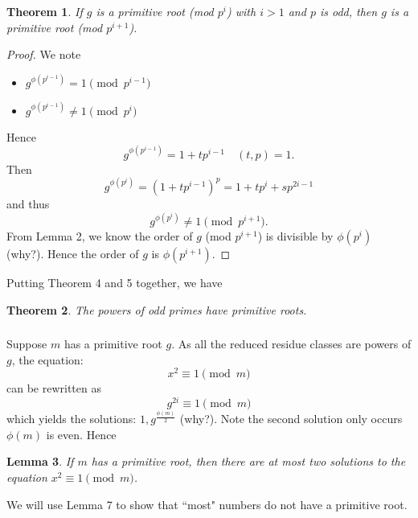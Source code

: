 \documentclass{article}
\newtheorem{theorem}{Theorem}
\newtheorem{lemma}[theorem]{Lemma}
\begin{document}
\begin{theorem}
    If $g$ is a primitive root (mod $p^{i}$) with $i > 1$ and $p$ is odd, then $g$ is a primitive root (mod $p^{i+1}$).
\end{theorem}
\begin{proof}
    We note
    \begin{itemize}
        \item $g^{\phi(p^{i-1})} = 1 \pmod{p^{i-1}}$
        \item $g^{\phi(p^{i-1})} \neq 1 \pmod{p^{i}}$
    \end{itemize}
    Hence 
    \begin{equation}
        g^{\phi(p^{i-1})} = 1 + tp^{i-1} \quad (t,p) = 1.
    \end{equation}
    Then
    \begin{equation}
        g^{\phi(p^{i})} = (1 + tp^{i-1})^{p}
        = 1 + tp^{i} + sp^{2i-1}
    \end{equation}
    and thus
        \begin{equation}
            g^{\phi(p^{i})} \neq 1 \pmod{p^{i+1}}.
        \end{equation}
    From Lemma 2, we know the order of $g$ (mod $p^{i+1}$) is divisible by $\phi(p^{i})$ (why?). Hence the order of $g$ is $\phi(p^{i+1})$.
\end{proof}
Putting Theorem 4 and 5 together, we have
\begin{theorem}
    The powers of odd primes have primitive roots.
\end{theorem}

\subsubsection{}
Suppose $m$ has a primitive root $g$. As all the reduced residue classes are powers of $g$, the equation:
\begin{equation}
    x^{2} \equiv 1 \pmod{m}
\end{equation}
can be rewritten as
\begin{equation}
    g^{2i} \equiv 1 \pmod{m}
\end{equation}
which yields the solutions: $1, g^{\frac{\phi(m)}{2}}$ (why?). Note the second solution only occurs $\phi(m)$ is even. Hence
\begin{lemma}
    If $m$ has a primitive root, then there are at most two solutions to the equation
    $x^{2} \equiv 1 \pmod{m}$.
\end{lemma}
We will use Lemma 7 to show that ``most" numbers do not have a primitive root.
\end{document}
